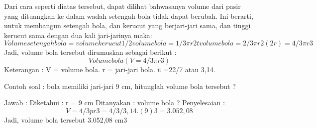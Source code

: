 Dari cara seperti diatas tersebut, dapat dilihat bahwasanya volume dari pasir yang dituangkan ke dalam wadah setengah bola tidak dapat berubah. Ini berarti, untuk membangun setengah bola, dan kerucut yang berjari-jari sama, dan tinggi kerucut sama dengan dua kali jari-jarinya maka:
\begin{equation}
Volume setengah bola = volume kerucut
1/2 volume bola = 1/3 πr2t
volume bola = 2/3πr2(2r)
                         = 4/3πr3
\end{equation}
Jadi, volume bola tersebut dirumuskan sebagai berikut :
\begin{equation}
Volume bola ( V = 4/3πr3 )
\end{equation}
Keterangan :
V = volume bola.
r = jari-jari bola.
π =22/7 atau 3,14.

Contoh soal :
bola memiliki jari-jari 9 cm, hitunglah volume bola tersebut ?

Jawab :
Diketahui : r = 9 cm
Ditanyakan : volume bola ?
Penyelesaian :
\begin{equation}
V   = 4/3pr3
    = 4/3/ 3 , 14 . (9)3
    = 3.052,08
\end{equation}
Jadi, volume bola tersebut 3.052,08 cm3